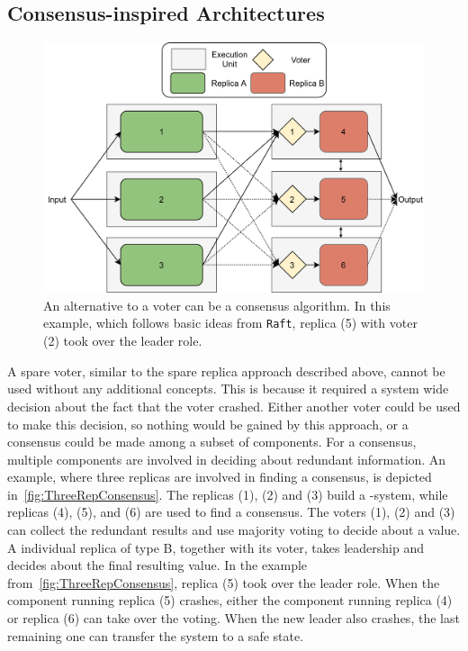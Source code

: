 \subsection{Consensus-inspired Architectures}
\begin{figure}[!hb]
	\centering
	\includegraphics[width=0.75\linewidth]{images/ThreeComponentConsensus}
	\caption{An alternative to a voter can be a consensus algorithm. In this example, which follows basic ideas from \texttt{Raft}, replica (5) with voter (2) took over the leader role.}
	\label{fig:ThreeRepConsensus}
\end{figure}

A spare voter, similar to the spare replica approach described above, cannot be used without any additional concepts.
This is because it required a system wide decision about the fact that the voter crashed.
Either another voter could be used to make this decision, so nothing would be gained by this approach, or a consensus could be made among a subset of components.
For a consensus, multiple components are involved in deciding about redundant information.
An example, where three replicas are involved in finding a consensus, is depicted in~\autoref{fig:ThreeRepConsensus}.
The replicas (1), (2) and (3) build a -system, while replicas (4), (5), and (6) are used to find a consensus.
The voters (1), (2) and (3) can collect the redundant results and use majority voting to decide about a value.
A individual replica of type B, together with its voter, takes leadership and decides about the final resulting value.
In the example from~\autoref{fig:ThreeRepConsensus}, replica (5) took over the leader role.
When the component running replica (5) crashes, either the component running replica (4) or replica (6) can take over the voting.
When the new leader also crashes, the last remaining one can transfer the system to a safe state.
\\

